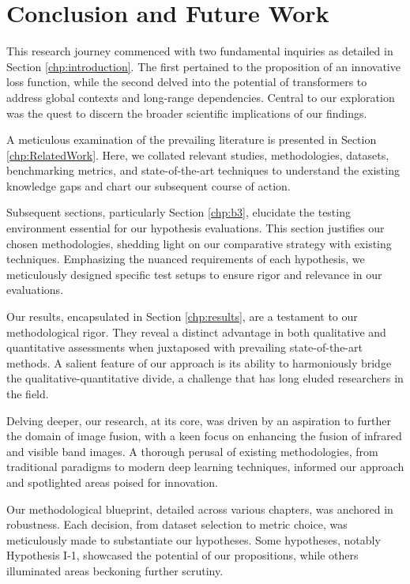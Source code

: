 \chapter{Conclusion and Future Work}
\label{chp:b7}

This research journey commenced with two fundamental inquiries as detailed in Section \ref{chp:introduction}. The first pertained to the proposition of an innovative loss function, while the second delved into the potential of transformers to address global contexts and long-range dependencies. Central to our exploration was the quest to discern the broader scientific implications of our findings.

A meticulous examination of the prevailing literature is presented in Section \ref{chp:RelatedWork}. Here, we collated relevant studies, methodologies, datasets, benchmarking metrics, and state-of-the-art techniques to understand the existing knowledge gaps and chart our subsequent course of action.

Subsequent sections, particularly Section \ref{chp:b3}, elucidate the testing environment essential for our hypothesis evaluations. This section justifies our chosen methodologies, shedding light on our comparative strategy with existing techniques. Emphasizing the nuanced requirements of each hypothesis, we meticulously designed specific test setups to ensure rigor and relevance in our evaluations.

Our results, encapsulated in Section \ref{chp:results}, are a testament to our methodological rigor. They reveal a distinct advantage in both qualitative and quantitative assessments when juxtaposed with prevailing state-of-the-art methods. A salient feature of our approach is its ability to harmoniously bridge the qualitative-quantitative divide, a challenge that has long eluded researchers in the field.

Delving deeper, our research, at its core, was driven by an aspiration to further the domain of image fusion, with a keen focus on enhancing the fusion of infrared and visible band images. A thorough perusal of existing methodologies, from traditional paradigms to modern deep learning techniques, informed our approach and spotlighted areas poised for innovation.

Our methodological blueprint, detailed across various chapters, was anchored in robustness. Each decision, from dataset selection to metric choice, was meticulously made to substantiate our hypotheses. Some hypotheses, notably Hypothesis I-1, showcased the potential of our propositions, while others illuminated areas beckoning further scrutiny.

